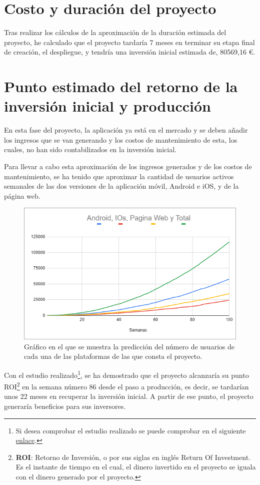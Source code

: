\section{Costo y duración del proyecto}

Tras realizar los cálculos de la aproximación de la duración estimada del proyecto, he calculado que el proyecto tardaría 7 meses en terminar su etapa final de creación, el despliegue, y tendría una inversión inicial estimada de, 80569,16 €.

\section{Punto estimado del retorno de la inversión inicial y producción}

En esta fase del proyecto, la aplicación ya está en el mercado y se deben añadir los ingresos que se van generando y los costos de mantenimiento de esta, los cuales, no han sido contabilizados en la inversión inicial.

Para llevar a cabo esta aproximación de los ingresos generados y de los costos de mantenimiento, se ha tenido que aproximar la cantidad de usuarios activos semanales de las dos versiones de la aplicación móvil, Android e iOS, y de la página web.

\begin{figure}[H]
    \centering
    \includegraphics[width=1\textwidth]{Memoria_TFG_LaTeX/images/prediccionCrecimientoUsuarios.png}
    \caption{Gráfico en el que se muestra la predicción del número de usuarios de cada una de las plataformas de las que consta el proyecto.}
    \label{fig:crecimientoUsuarios}
\end{figure}

Con el estudio realizado\footnote{Si desea comprobar el estudio realizado se puede comprobar en el siguiente \href{https://docs.google.com/spreadsheets/d/1Xp9dhk1jerlhGhqqkd2Uu2R6KGxOjXPJQnaUy1ktfSA/edit?usp=sharing}{enlace}.}, se ha demostrado que el proyecto alcanzaría su punto ROI\footnote{\textbf{ROI}: Retorno de Inversión, o por sus siglas en inglés Return Of Investment. Es el instante de tiempo en el cual, el dinero invertido en el proyecto se iguala con el dinero generado por el proyecto.} en la semana número 86 desde el paso a producción, es decir, se tardarían unos 22 meses en recuperar la inversión inicial. A partir de ese punto, el proyecto generaría beneficios para sus inversores. 

